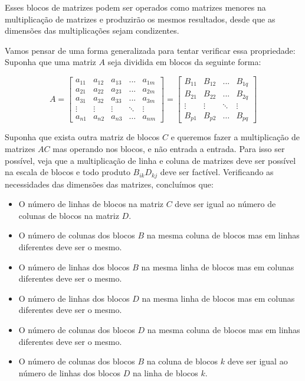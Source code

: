 \documentclass[11pt, a4paper]{article}
\begin{document}
\void[-0.4]

Esses blocos de matrizes podem ser operados como matrizes menores na multiplicação de matrizes e produzirão os mesmos resultados, desde que as dimensões das multiplicações sejam condizentes. 

Vamos pensar de uma forma generalizada para tentar verificar essa propriedade: Suponha que uma matriz \(A\) seja dividida em blocos da seguinte forma:

\void[-1]

\[
A=
\begin{bmatrix}
a_{11} & a_{12} & a_{13} & ... & a_{1m}\\
a_{21} & a_{22} & a_{23} & ... & a_{2m}\\
a_{31} & a_{32} & a_{33} & ... & a_{3m}\\
\vdots & \vdots & \vdots & \ddots & \vdots \\
a_{n1} & a_{n2} & a_{n3} & \hdots & a_{nm}
\end{bmatrix}
=
\begin{bmatrix}
B_{11} & B_{12} & ... & B_{1q}\\
B_{21} & B_{22} & ... & B_{2q}\\
\vdots & \vdots & \ddots & \vdots \\
B_{p1} & B_{p2} & \hdots & B_{pq}
\end{bmatrix}
\]

\void[-0.5]

Suponha que exista outra matriz de blocos \(C\) e queremos fazer a multiplicação de matrizes \(AC\) mas operando nos blocos, e não entrada a entrada. Para isso ser possível, veja que a multiplicação de linha e coluna de matrizes deve ser possível na escala de blocos e todo produto \(B_{ik}D_{kj}\) deve ser factível. Verificando as necessidades das dimensões das matrizes, concluímos que:

\begin{itemize}
    \item O número de linhas de blocos na matriz \(C\) deve ser igual ao número de colunas de blocos na matriz \(D\).
    \void[-0.1]
    \item O número de colunas dos blocos \(B\) na mesma coluna de blocos mas em linhas diferentes deve ser o mesmo.
    \void[-0.1]
    \item O número de linhas dos blocos \(B\) na mesma linha de blocos mas em colunas diferentes deve ser o mesmo.
    \void[-0.1]
    \item O número de linhas dos blocos \(D\) na mesma linha de blocos mas em colunas diferentes deve ser o mesmo.
    \void[-0.1]
    \item O número de colunas dos blocos \(D\) na mesma coluna de blocos mas em linhas diferentes deve ser o mesmo.
    \void[-0.1]
    \item O número de colunas dos blocos \(B\) na coluna de blocos \(k\) deve ser igual ao número de linhas dos blocos \(D\) na linha de blocos \(k\).
\end{itemize}
\end{document}
